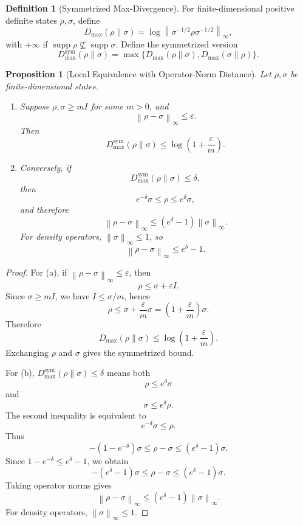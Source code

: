 \documentclass[12pt]{article}
\newtheorem{proposition}[theorem]{Proposition}
\theoremstyle{definition}
\newtheorem{definition}[theorem]{Definition}
\DeclareMathOperator{\supp}{supp}
\newcommand{\norm}[1]{\left\lVert#1\right\rVert}
\newcommand{\Dmax}{D_{\max}}
\newcommand{\Dmaxsym}{D_{\max}^{\mathrm{sym}}}
\begin{document}
\begin{definition}[Symmetrized Max-Divergence]
\label{def:dmax}
For finite-dimensional positive definite states $\rho,\sigma$, define
\[
\Dmax(\rho\|\sigma)
=
\log
\left\|
\sigma^{-1/2}\rho\sigma^{-1/2}
\right\|_\infty,
\]
with $+\infty$ if $\supp\rho\not\subseteq\supp\sigma$.
Define the symmetrized version
\[
\Dmaxsym(\rho\|\sigma)
=
\max\{
\Dmax(\rho\|\sigma),
\Dmax(\sigma\|\rho)
\}.
\]
\end{definition}

\begin{proposition}[Local Equivalence with Operator-Norm Distance]
\label{prop:grounding-local-equivalence}
Let $\rho,\sigma$ be finite-dimensional states.
\begin{enumerate}[label=(\alph*)]
\item Suppose $\rho,\sigma\ge mI$ for some $m>0$, and
\[
\norm{\rho-\sigma}_\infty\le\varepsilon.
\]
Then
\[
\Dmaxsym(\rho\|\sigma)
\le
\log\left(1+\frac{\varepsilon}{m}\right).
\]
\item Conversely, if
\[
\Dmaxsym(\rho\|\sigma)\le\delta,
\]
then
\[
e^{-\delta}\sigma
\le
\rho
\le
e^\delta\sigma,
\]
and therefore
\[
\norm{\rho-\sigma}_\infty
\le
(e^\delta-1)
\norm{\sigma}_\infty.
\]
For density operators, $\norm{\sigma}_\infty\le1$, so
\[
\norm{\rho-\sigma}_\infty
\le
e^\delta-1.
\]
\end{enumerate}
\end{proposition}

\begin{proof}
For (a), if $\norm{\rho-\sigma}_\infty\le\varepsilon$, then
\[
\rho\le\sigma+\varepsilon I.
\]
Since $\sigma\ge mI$, we have $I\le\sigma/m$, hence
\[
\rho
\le
\sigma+\frac{\varepsilon}{m}\sigma
=
\left(1+\frac{\varepsilon}{m}\right)\sigma.
\]
Therefore
\[
\Dmax(\rho\|\sigma)
\le
\log\left(1+\frac{\varepsilon}{m}\right).
\]
Exchanging $\rho$ and $\sigma$ gives the symmetrized bound.

For (b), $\Dmaxsym(\rho\|\sigma)\le\delta$ means both
\[
\rho\le e^\delta\sigma
\]
and
\[
\sigma\le e^\delta\rho.
\]
The second inequality is equivalent to
\[
e^{-\delta}\sigma\le\rho.
\]
Thus
\[
-(1-e^{-\delta})\sigma
\le
\rho-\sigma
\le
(e^\delta-1)\sigma.
\]
Since $1-e^{-\delta}\le e^\delta-1$, we obtain
\[
-(e^\delta-1)\sigma
\le
\rho-\sigma
\le
(e^\delta-1)\sigma.
\]
Taking operator norms gives
\[
\norm{\rho-\sigma}_\infty
\le
(e^\delta-1)
\norm{\sigma}_\infty.
\]
For density operators, $\norm{\sigma}_\infty\le1$.
\end{proof}
\end{document}
